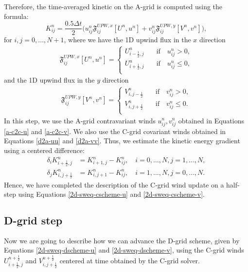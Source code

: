 Therefore, the time-averaged kinetic on the A-grid is computed using the formula:
\begin{equation}
	K_{ij}^n = \frac{0.5\Delta t}{2}\bigg(
	{u}_{ij}^{n}\mathfrak{F}_{ij}^{UPW,x} [{{U}^n},u^n] +
    {v}_{ij}^{n}\mathfrak{F}_{ij}^{UPW,y} [{{V}^n},v^n]\bigg),
\end{equation}
for $i,j=0,\ldots,N+1$,
where we have the 1D upwind flux in the $x$ direction
\begin{align}
	\mathfrak{F}_{ij}^{UPW,x} [{{U}^n},u^n]=
	\begin{cases}
		{U}_{i-\frac{1}{2},j}^n
		\quad &\text{if} \quad 
		{u}_{ij}^{n}>0,\\
		{U}_{i+\frac{1}{2},j}^n
		\quad &\text{if} \quad 
		{u}_{ij}^{n}\leq0,\\
	\end{cases}
\end{align}
and the 1D upwind flux in the $y$ direction
\begin{align}
	\mathfrak{F}_{ij}^{UPW,y} [{{V}^n},v^n]=
	\begin{cases}
		{V}_{i,j-\frac{1}{2}}^n
		\quad &\text{if} \quad 
		{v}_{ij}^{n}>0,\\
		{V}_{i,j+\frac{1}{2}}^n
		\quad &\text{if} \quad 
		{v}_{ij}^{n}\leq0.\\
	\end{cases}
\end{align}
In this step, we use the A-grid contravariant winds ${u}_{ij}^{n},{v}_{ij}^{n}$ obtained in Equations \eqref{a-c2c-u} and \eqref{a-c2c-v}.
We also use the C-grid covariant winds obtained in Equations \eqref{d2a-uu} and \eqref{d2a-vv}.
Thus, we estimate the kinetic energy gradient using a centered difference:
\begin{align}
	\label{2d-sw-eq-Cgrid-ke-dx}
	\delta_i K^n_{i+\frac{1}{2},j} &= K_{i+1,j}^n - K_{ij}^n,
	\quad i=0,\ldots,N, j=1,\ldots,N,\\
	\label{2d-sw-eq-Cgrid-ke-dy}
	\delta_j K^n_{i,j+\frac{1}{2}} &= K_{i,j+1}^n - K_{ij}^n,
	\quad i=1,\ldots,N, j=0,\ldots,N.
\end{align}
Hence, we have completed the description of the C-grid wind update on a half-step using Equations \eqref{2d-sweq-cscheme-u} and \eqref{2d-sweq-cscheme-v}.


\subsection{D-grid step}
\label{dsw-grid}
Now we are going to describe how we can advance the D-grid scheme,
given by Equations \eqref{2d-sweq-dscheme-u} and \eqref{2d-sweq-dscheme-v},
using the C-grid winds $U_{i+\frac{1}{2},j}^{n+\frac{1}{2}}$ and $V_{i,j+\frac{1}{2}}^{n+\frac{1}{2}}$ centered at time obtained by the C-grid solver.

